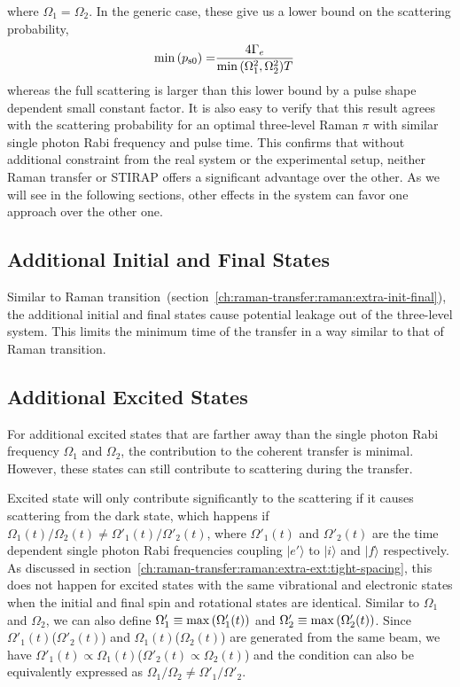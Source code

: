 where $\Omega_1=\Omega_2$.
In the generic case, these give us a lower bound on the scattering probability,
\begin{align*}
  \min{\left({p_{\mathrm{s}0}}\right)}=&\frac{4\Gamma_e}{\min{\left({\Omega_1^2, \Omega_2^2}\right)}T}
\end{align*}
whereas the full scattering is larger than this lower bound by a pulse shape dependent
small constant factor.
It is also easy to verify that this result agrees with the scattering probability for
an optimal three-level Raman $\pi$ with similar single photon Rabi frequency and pulse time.
This confirms that without additional constraint from the real system or the experimental setup,
neither Raman transfer or STIRAP offers a significant advantage over the other.
As we will see in the following sections,
other effects in the system can favor one approach over the other one.

\subsection{Additional Initial and Final States}
\label{ch:raman-transfer:stirap:extra-init-final}

Similar to Raman transition~(section~\ref{ch:raman-transfer:raman:extra-init-final}),
the additional initial and final states cause potential leakage out of the three-level system.
This limits the minimum time of the transfer in a way similar to that of Raman transition.

\subsection{Additional Excited States}
\label{ch:raman-transfer:stirap:extra-ext}

For additional excited states that are farther away than the single photon Rabi frequency
$\Omega_1$ and $\Omega_2$, the contribution to the coherent transfer is minimal.
However, these states can still contribute to scattering during the transfer.

Excited state will only contribute significantly to the scattering if it causes scattering
from the dark state, which happens if $\Omega_1(t)/\Omega_2(t)\neq\Omega'_1(t)/\Omega'_2(t)$,
where $\Omega'_1(t)$ and $\Omega'_2(t)$ are the time dependent single photon Rabi frequencies
coupling $|e'\rangle$ to $|i\rangle$ and $|f\rangle$ respectively.
As discussed in section~\ref{ch:raman-transfer:raman:extra-ext:tight-spacing},
this does not happen for excited states with the same vibrational and electronic states
when the initial and final spin and rotational states are identical.
Similar to $\Omega_1$ and $\Omega_2$, we can also define
$\Omega'_1\equiv\max{\left({\Omega'_1(t)}\right)}$ and $\Omega'_2\equiv\max{\left({\Omega'_2(t)}\right)}$.
Since $\Omega'_1(t)$($\Omega'_2(t)$) and $\Omega_1(t)$($\Omega_2(t)$)
are generated from the same beam, we have
$\Omega'_1(t)\propto\Omega_1(t)$($\Omega'_2(t)\propto\Omega_2(t)$)
and the condition can also be equivalently expressed as
$\Omega_1/\Omega_2\neq\Omega'_1/\Omega'_2$.

